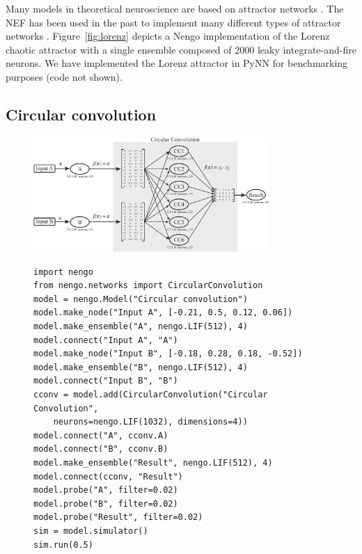 \documentclass{frontiersSCNS}
\begin{document}
Many models in theoretical neuroscience
are based on attractor networks \citep{amit1992, deco2003}.
The NEF has been used in the past
to implement many different types of
attractor networks \citep{eliasmith2005}.
Figure~\ref{fig:lorenz} depicts
a Nengo implementation of the Lorenz chaotic attractor
with a single ensemble
composed of 2000 leaky integrate-and-fire neurons.
We have implemented the Lorenz attractor
in PyNN for benchmarking purposes
(code not shown).

\subsection{Circular convolution} \label{sec:cconv}

\begin{figure}
\begin{center}
  \includegraphics[width=0.8\textwidth]{cconv}
  \begin{minipage}{0.46\textwidth}
    \begin{lstlisting}[basicstyle={\footnotesize\ttfamily}]
import nengo
from nengo.networks import CircularConvolution
model = nengo.Model("Circular convolution")
model.make_node("Input A", [-0.21, 0.5, 0.12, 0.06])
model.make_ensemble("A", nengo.LIF(512), 4)
model.connect("Input A", "A")
model.make_node("Input B", [-0.18, 0.28, 0.18, -0.52])
model.make_ensemble("B", nengo.LIF(512), 4)
model.connect("Input B", "B")
cconv = model.add(CircularConvolution("Circular Convolution",
    neurons=nengo.LIF(1032), dimensions=4))
model.connect("A", cconv.A)
model.connect("B", cconv.B)
model.make_ensemble("Result", nengo.LIF(512), 4)
model.connect(cconv, "Result")
model.probe("A", filter=0.02)
model.probe("B", filter=0.02)
model.probe("Result", filter=0.02)
sim = model.simulator()
sim.run(0.5)
    \end{lstlisting}
  \end{minipage}
  \begin{minipage}{0.46\textwidth}

\end{minipage}
\end{center}
\end{figure}
\end{document}
